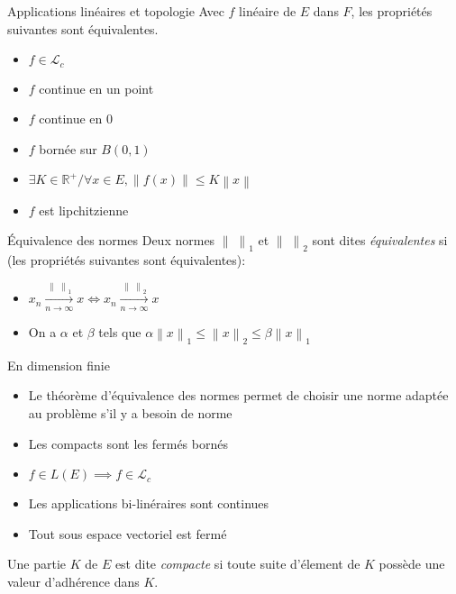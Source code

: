 \documentclass[french, a4paper, 11pt, twocolumn]{article}
\newcommand{\norme}[1]{\left\| #1\right\|}
\newcommand{\R}{\mathbb{R}}   %
\begin{document}
\begin{theoreme}{Applications linéaires et topologie}
  Avec \(f\) linéaire de \(E\) dans \(F\), les propriétés suivantes sont équivalentes.
  \begin{itemize}[label=\(\bullet\)]
    \item \(f\in \mathcal{L}_{c}\)
        \item \(f\) continue en un point
        \item \(f\) continue en \(0\)
        \item \(f\) bornée sur \(B(0,1)\)
        \item \(\exists K \in \R^+/\forall x\in E, \norme{f(x)}\leq K\norme{x}\)
        \item \(f\) est lipchitzienne
    \end{itemize}
\end{theoreme}

\begin{theoreme}{Équivalence des normes}
  Deux normes \(\norme{\;}_{1}\) et \(\norme{\;}_{2}\) sont dites \emph{équivalentes} si (les propriétés suivantes sont équivalentes):
  \begin{itemize}[label=\(\bullet\)]
    \item \(x_{n} \xrightarrow[n\rightarrow \infty]{\norme{\;}_{1}} x \iff x_{n} \xrightarrow[n\rightarrow \infty]{\norme{\;}_{2}}x\)
    \item On a \(\alpha\) et \(\beta\) tels que \(\alpha\norme{x}_{1}\leqslant\norme{x}_{2}\leqslant\beta\norme{x}_{1}\)
  \end{itemize}
\end{theoreme}

\begin{theoreme}{En dimension finie}
    \begin{itemize}[label=\(\bullet\)]
        \item Le théorème d'équivalence des normes permet de choisir une norme adaptée au problème s'il y a besoin de norme
        \item Les compacts sont les fermés bornés
      \item \(f \in L(E) \implies f \in \mathcal{L}_c\)
        \item Les applications bi-linéraires sont continues
        \item Tout sous espace vectoriel est fermé
    \end{itemize}
\end{theoreme}

\begin{definition}
    Une partie \(K\) de \(E\) est dite \emph{compacte} si toute suite d'élement de \(K\) possède une valeur d’adhérence dans \(K\).
\end{definition}
\end{document}
